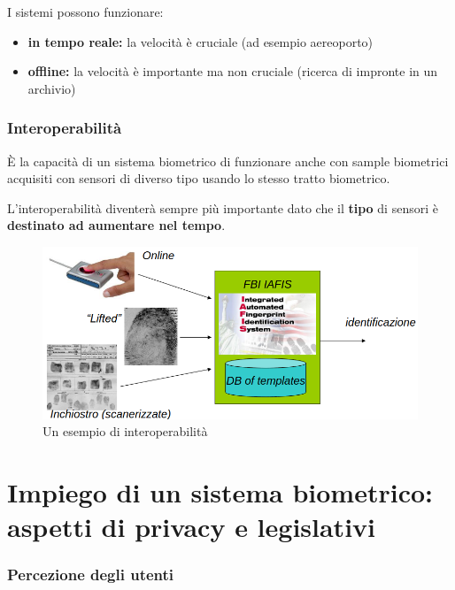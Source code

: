 I sistemi possono funzionare:
\begin{itemize}
    \item \textbf{in tempo reale:} la velocità è cruciale (ad esempio aereoporto)
    \item \textbf{offline:} la velocità è importante ma non cruciale (ricerca di impronte in un archivio)
\end{itemize}

\subsubsection{Interoperabilità}

È la capacità di un sistema biometrico di funzionare anche con sample biometrici acquisiti con sensori di diverso tipo usando lo stesso tratto biometrico.

L'interoperabilità diventerà sempre più importante dato che il \textbf{tipo} di sensori è \textbf{destinato ad aumentare nel tempo}.

\begin{figure}[h]
    \centering
    \includegraphics[width=0.95\linewidth]{chapters/images-chap1/interoperabilita.png}
    \caption{Un esempio di interoperabilità}
    \label{fig:interoperabilita}
\end{figure}

\newpage

\section{Impiego di un sistema biometrico: aspetti di privacy e legislativi}

\subsubsection{Percezione degli utenti}


